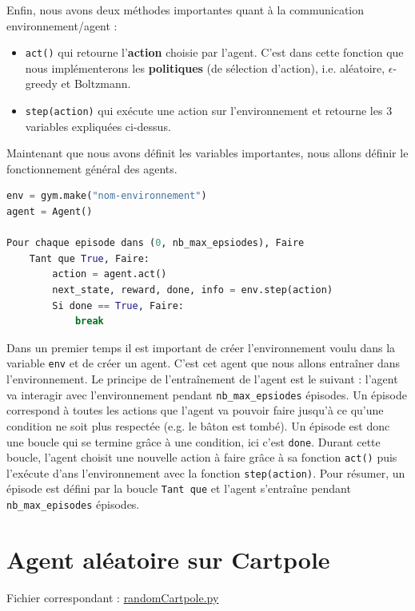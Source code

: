 \documentclass[10pt,a4paper]{article}
\begin{document}
Enfin, nous avons deux méthodes importantes quant à la communication environnement/agent :
\begin{itemize}
	\item \lstinline{act()} qui retourne l'\textbf{action} choisie par l'agent. C'est dans cette fonction que nous implémenterons les \textbf{politiques} (de sélection d'action), i.e. aléatoire, $\epsilon$-greedy et Boltzmann. 
	\item \lstinline{step(action)} qui exécute une action sur l'environnement et retourne les 3 variables expliquées ci-dessus. 
\end{itemize}

Maintenant que nous avons définit les variables importantes, nous allons définir le fonctionnement général des agents.

\begin{lstlisting}[language=Python, caption=Pseudo-code du fonctionnement de l'agent dans son environnement]
env = gym.make("nom-environnement")
agent = Agent()

Pour chaque episode dans (0, nb_max_epsiodes), Faire
    Tant que True, Faire:
        action = agent.act()
        next_state, reward, done, info = env.step(action)
        Si done == True, Faire:
            break
\end{lstlisting}

Dans un premier temps il est important de créer l'environnement voulu dans la variable \lstinline{env} et de créer un agent. C'est cet agent que nous allons entraîner dans l'environnement.
Le principe de l'entraînement de l'agent est le suivant : l'agent va interagir avec l'environnement pendant \lstinline{nb_max_epsiodes} épisodes. Un épisode correspond à toutes les actions que l'agent va pouvoir faire jusqu'à ce qu'une condition ne soit plus respectée (e.g. le bâton est tombé). Un épisode est donc une boucle qui se termine grâce à une condition, ici c'est \lstinline{done}. Durant cette boucle, l'agent choisit une nouvelle action à faire grâce à sa fonction \lstinline{act()} puis l'exécute d'ans l'environnement avec la fonction \lstinline{step(action)}. Pour résumer, un épisode est défini par la boucle \lstinline{Tant que} et l'agent s'entraîne pendant \lstinline{nb_max_episodes} épisodes.


\section{Agent aléatoire sur Cartpole}

Fichier correspondant : \href{https://github.com/NellyBarret/IA5-TP-APR/blob/master/randomCartPole.py}{randomCartpole.py}
\end{document}
